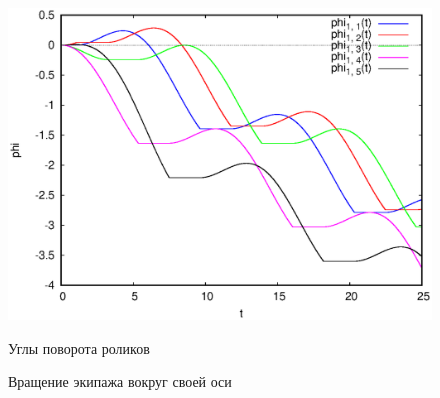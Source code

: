 \begin{figure}[h]
{        \includegraphics[scale=0.33]{content/pic/self_rot_25/rol_ang.eps}
        \caption{Углы поворота роликов}
        \label{fig:self_rot_25_rol_ang}
    }
    \caption{Вращение экипажа вокруг своей оси}
\end{figure}
\label{fig:self_rot}

\newpage



